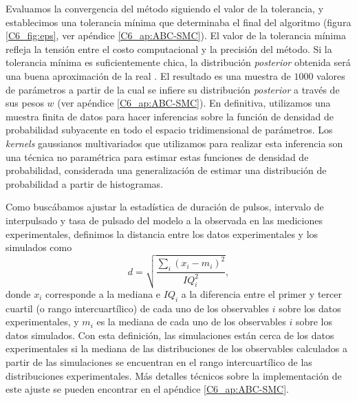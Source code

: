\documentclass[./main.tex]{subfiles}
\begin{document}
Evaluamos la convergencia del método siguiendo el valor de la tolerancia, y establecimos una tolerancia mínima que determinaba el final del algoritmo \cite{Costa2021} (figura \ref{C6_fig:eps}, ver apéndice \ref{C6_ap:ABC-SMC}). El valor de la tolerancia mínima refleja la tensión entre el costo computacional y la precisión del método. Si la tolerancia mínima es suficientemente chica, la distribución \textit{posterior} obtenida será una buena aproximación de la real \cite{Toni2010}. El resultado es una muestra de $1000$ valores de parámetros a partir de la cual se infiere su distribución \textit{posterior} a través de sus pesos $w$ (ver apéndice \ref{C6_ap:ABC-SMC}). En definitiva, utilizamos una muestra finita de datos para hacer inferencias sobre la función de densidad de probabilidad subyacente en todo el espacio tridimensional de parámetros. Los \textit{kernels} gaussianos multivariados que utilizamos para realizar esta inferencia son una técnica no paramétrica para estimar estas funciones de densidad de probabilidad, considerada una generalización de estimar una distribución de probabilidad a partir de histogramas. 


Como buscábamos ajustar la estadística de duración de pulsos, intervalo de interpulsado y tasa de pulsado del modelo a la observada en las mediciones experimentales, definimos la distancia entre los datos experimentales y los simulados como
\begin{equation}
    d = \sqrt{\frac{\sum_i (x_i - m_i)^2}{IQ_i^2}},
    \label{C6_eq:distancia_MC}
\end{equation}
donde $x_i$ corresponde a la mediana e $IQ_i$ a la diferencia entre el primer y tercer cuartil (o rango intercuartílico) de cada uno de los observables $i$ sobre los datos experimentales, y $m_i$ es la mediana de cada uno de los observables $i$ sobre los datos simulados. Con esta definición, las simulaciones están cerca de los datos experimentales si la mediana de las distribuciones de los observables calculados a partir de las simulaciones se encuentran en el rango intercuartílico de las distribuciones experimentales. Más detalles técnicos sobre la implementación de este ajuste se pueden encontrar en el apéndice \ref{C6_ap:ABC-SMC}.
\end{document}
